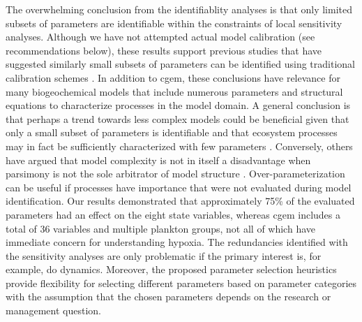 \documentclass[letterpaper,12pt,oneside]{article}\usepackage[]{graphicx}\usepackage[]{color}
\begin{document}
The overwhelming conclusion from the identifiablity analyses is that only limited subsets of parameters are identifiable within the constraints of local sensitivity analyses. Although we have not attempted actual model calibration (see recommendations below), these results support previous studies that have suggested similarly small subsets of parameters can be identified using traditional calibration schemes \citep[e.g.,][]{Wheater86,Ye97,Omlin01}.  In addition to \ac{cgem}, these conclusions have relevance for many biogeochemical models that include numerous parameters and structural equations to characterize processes in the model domain.  A general conclusion is that perhaps a trend towards less complex models could be beneficial given that only a small subset of parameters is identifiable and that ecosystem processes may in fact be sufficiently characterized with few parameters \citep{Ye97}.  Conversely, others have argued that model complexity is not in itself a disadvantage when parsimony is not the sole arbitrator of model structure \citep{Reichert97}. Over-parameterization can be useful if processes have importance that were not evaluated during model identification.  Our results demonstrated that approximately 75\% of the evaluated parameters had an effect on the eight state variables, whereas \ac{cgem} includes a total of 36 variables and multiple plankton groups, not all of which have immediate concern for understanding hypoxia. The redundancies identified with the sensitivity analyses are only problematic if the primary interest is, for example, \ac{do} dynamics.  Moreover, the proposed parameter selection heuristics provide flexibility for selecting different parameters based on parameter categories with the assumption that the chosen parameters depends on the research or management question. 



\end{document}
